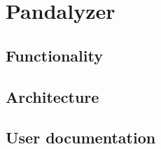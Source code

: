 \chapter{Pandalyzer}

\section{Functionality}

\section{Architecture}

\section{User documentation}
